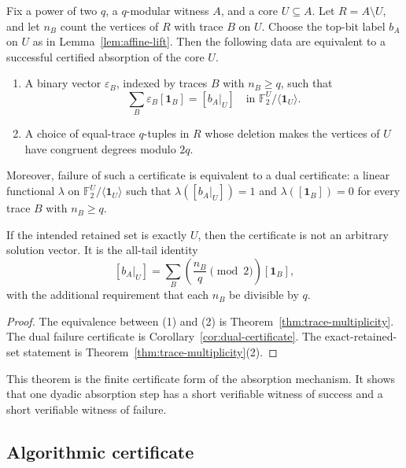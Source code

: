 \documentclass[thmsec,dntnbr,nolinenbrs]{dmgt}
\numberwithin{equation}{section}
\newcommand{\F}{\mathbb{F}}
\newcommand{\one}{\mathbf{1}}
\begin{document}
\begin{theorem}\label{thm:certificate}
Fix a power of two \(q\), a \(q\)-modular witness \(A\), and a core \(U\subseteq A\).  Let \(R=A\setminus U\), and let \(n_B\) count the vertices of \(R\) with trace \(B\) on \(U\).  Choose the top-bit label \(b_A\) on \(U\) as in Lemma~\ref{lem:affine-lift}.  Then the following data are equivalent to a successful certified absorption of the core \(U\).
\begin{enumerate}[label=\textup{(\arabic*)}, leftmargin=*]
    \item A binary vector \(\varepsilon_B\), indexed by traces \(B\) with \(n_B\ge q\), such that
    \[
        \sum_B \varepsilon_B[\one_B]=[b_A|_U]
        \quad\text{in }\F_2^U/\langle \one_U\rangle.
    \]
    \item A choice of equal-trace \(q\)-tuples in \(R\) whose deletion makes the vertices of \(U\) have congruent degrees modulo \(2q\).
\end{enumerate}
Moreover, failure of such a certificate is equivalent to a dual certificate: a linear functional \(\lambda\) on \(\F_2^U/\langle \one_U\rangle\) such that \(\lambda([b_A|_U])=1\) and \(\lambda([\one_B])=0\) for every trace \(B\) with \(n_B\ge q\).

If the intended retained set is exactly \(U\), then the certificate is not an arbitrary solution vector.  It is the all-tail identity
\[
        [b_A|_U]=\sum_B\left(\frac{n_B}{q}\pmod 2\right)[\one_B],
\]
with the additional requirement that each \(n_B\) be divisible by \(q\).
\end{theorem}

\begin{proof}
The equivalence between \textup{(1)} and \textup{(2)} is Theorem~\ref{thm:trace-multiplicity}.  The dual failure certificate is Corollary~\ref{cor:dual-certificate}.  The exact-retained-set statement is Theorem~\ref{thm:trace-multiplicity}\textup{(2)}.
\end{proof}

This theorem is the finite certificate form of the absorption mechanism.  It shows that one dyadic absorption step has a short verifiable witness of success and a short verifiable witness of failure.

\subsection{Algorithmic certificate}\label{sec:algorithmic-certificate}
\end{document}
